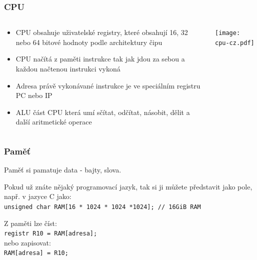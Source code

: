 \documentclass{beamer}
\begin{document}
\begin{frame}
\frametitle{CPU}
\begin{columns}
\begin{column}{0.5\textwidth}
\begin{itemize}
\item CPU obsahuje uživatelské registry, které obsahují 16, 32 nebo 64 bitové hodnoty podle architektury čipu
\item CPU načítá z paměti instrukce tak jak jdou za sebou a každou načtenou instrukci vykoná
\item Adresa právě vykonávané instrukce je ve speciálním registru PC nebo IP
\item ALU část CPU která umí sčítat, odčítat, násobit, dělit a další aritmetické operace
\end{itemize}
\end{column}
\begin{column}{0.5\textwidth}  
\begin{center}
   \texttt{[image: cpu-cz.pdf]}
\end{center}
\end{column}
\end{columns}

\end{frame}



\begin{frame}
\frametitle{Paměť}

Paměť si pamatuje data - bajty, slova.

Pokud už znáte nějaký programovací jazyk, tak si ji můžete představit jako pole, např. v jazyce C jako:\\
\texttt{unsigned char RAM[16 * 1024 * 1024 *1024]; // 16GiB RAM}

\bigskip
Z paměti lze číst:\\
\texttt{registr R10 = RAM[adresa];}\\
nebo zapisovat:\\
\texttt{RAM[adresa] = R10;}

\end{frame}
\end{document}
